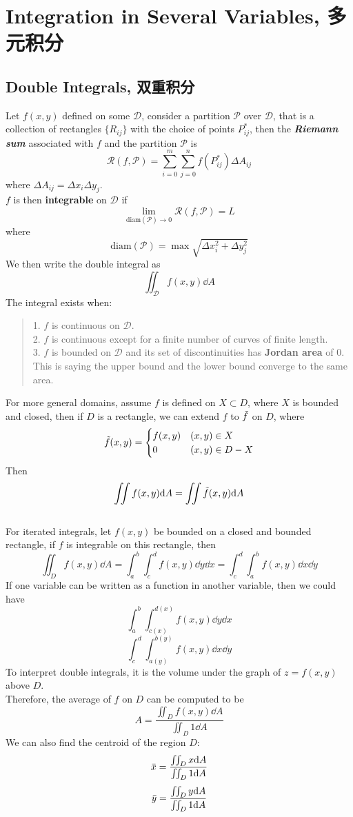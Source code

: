 \section{Integration in Several Variables, 多元积分}
\subsection{Double Integrals, 双重积分}
Let $f(x, y)$ defined on some $\mathscr{D}$, consider a partition $\mathscr{P}$ over $\mathscr{D}$, that is a collection of rectangles $\{R_{ij}\}$ with the choice of points $P_{ij}^{*}$, then the \textbf{\textit{Riemann sum}} associated with $f$ and the partition $\mathscr{P}$ is
$$\mathscr{R}(f, \mathscr{P}) = \sum_{i=0}^m \sum_{j=0}^n f(P_{ij}^{*}) \Delta A_{ij}$$
where $\Delta A_{ij} = \Delta x_i \Delta y_j$. \\
$f$ is then \textbf{integrable} on $\mathscr{D}$ if
$$\lim_{\text{diam}(\mathscr{P}) \to 0} \mathscr{R}(f, \mathscr{P}) = L$$
where
$$\text{diam}(\mathscr{P}) = \max{\sqrt{\Delta x_i^2 + \Delta y_j^2}}$$
We then write the double integral as
$$\iint_\mathscr{D} f(x, y) \dd A$$
The integral exists when:
\begin{quote}
    1. $f$ is continuous on $\mathscr{D}$. \\
    2. $f$ is continuous except for a finite number of curves of finite length. \\
    3. $f$ is bounded on $\mathscr{D}$ and its set of discontinuities has \textbf{Jordan area} of $0$. This is saying the upper bound and the lower bound converge to the same area. \\
\end{quote}
For more general domains, assume $f$ is defined on $X \subset D$, where $X$ is bounded and closed, then if $D$ is a rectangle, we can extend $f$ to $\Tilde{f}$ on $D$, where
$$\Tilde{f}(x, y) = \begin{cases}
    f(x, y) & (x, y) \in X \\
    0 & (x, y) \in D - X
\end{cases}$$
Then 
$$\iint f(x, y) \dd A = \iint \Tilde{f}(x, y) \dd A$$
\\
For iterated integrals, let $f(x, y)$ be bounded on a closed and bounded rectangle, if $f$ is integrable on this rectangle, then
$$\iint_D f(x, y) \dd A = \int_a^b \int_c^d f(x, y) \dd y \dd x = \int_c^d \int_a^b f(x, y) \dd x \dd y$$
If one variable can be written as a function in another variable, then we could have
$$\int_a^b \int_{c(x)}^{d(x)} f(x, y) \dd y \dd x$$
$$\int_c^d \int_{a(y)}^{b(y)} f(x, y) \dd x \dd y$$
To interpret double integrals, it is the volume under the graph of $z = f(x, y)$ above $D$. \\
Therefore, the average of $f$ on $D$ can be computed to be
$$A = \frac{\iint_D f(x, y) \dd A}{\iint_D 1 \dd A}$$
We can also find the centroid of the region $D$:
$$\Bar{x} = \frac{\iint_D x \dd A}{\iint_D 1 \dd A}$$
$$\Bar{y} = \frac{\iint_D y \dd A}{\iint_D 1 \dd A}$$

